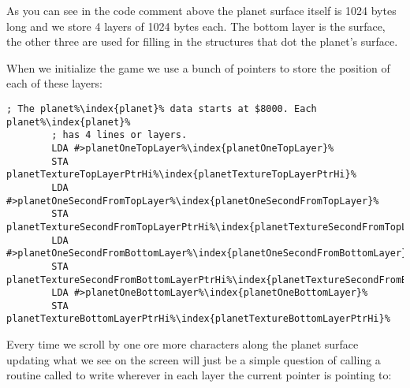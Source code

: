 As you can see in the code comment above the planet surface itself is 1024 bytes long and we store 4 layers of 1024
bytes each. The bottom layer is the surface, the other three are used for filling in the structures that dot the
planet's surface.

When we initialize the game we use a bunch of pointers to store the position of each of these layers:

\begin{lstlisting}[escapechar=\%]
        ; The planet%\index{planet}% data starts at $8000. Each planet%\index{planet}%
        ; has 4 lines or layers.
        LDA #>planetOneTopLayer%\index{planetOneTopLayer}%
        STA planetTextureTopLayerPtrHi%\index{planetTextureTopLayerPtrHi}%
        LDA #>planetOneSecondFromTopLayer%\index{planetOneSecondFromTopLayer}%
        STA planetTextureSecondFromTopLayerPtrHi%\index{planetTextureSecondFromTopLayerPtrHi}%
        LDA #>planetOneSecondFromBottomLayer%\index{planetOneSecondFromBottomLayer}%
        STA planetTextureSecondFromBottomLayerPtrHi%\index{planetTextureSecondFromBottomLayerPtrHi}%
        LDA #>planetOneBottomLayer%\index{planetOneBottomLayer}%
        STA planetTextureBottomLayerPtrHi%\index{planetTextureBottomLayerPtrHi}%
\end{lstlisting}

Every time we scroll by one ore more characters along the planet surface updating what we see on the screen will
just be a simple question of calling a routine called  to write wherever in each layer
the current pointer is pointing to:

